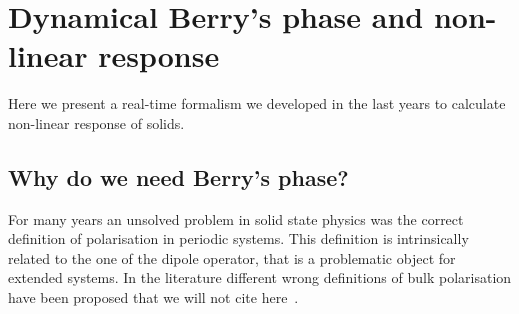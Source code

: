\section{Dynamical Berry's phase and non-linear response} 
\label{chapterberry}
Here we present a real-time formalism we developed in the last years to calculate non-linear response of solids.
\subsection{Why do we need Berry's phase?}
For many years an unsolved problem in solid state physics was the correct definition of polarisation in periodic systems.
This definition is intrinsically related to the one of the dipole operator, that is a problematic object for extended systems.
In the literature different wrong definitions of bulk polarisation have been proposed that we will not cite here~\cite{restanotes}.
\label{polisolated}
